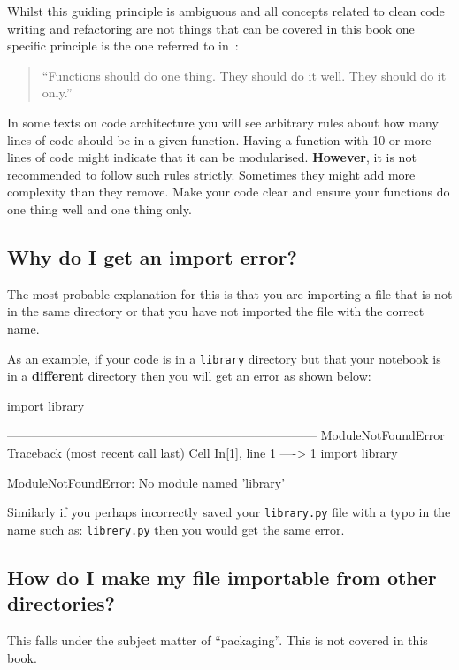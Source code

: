 Whilst this guiding principle is ambiguous and all concepts related to clean
code writing and refactoring are not things that can be covered in this book one
specific principle is the one referred to in~\cite{martin2009clean}:

\begin{quote}
``Functions should do one thing. They should do it well. They should do it
only.''
\end{quote}



In some texts on code architecture you will see arbitrary rules about how many
lines of code should be in a given function. Having a function with 10 or more
lines of code might indicate that it can be modularised. \textbf{However}, it is
not
recommended to follow such rules strictly. Sometimes they might add more complexity than
they remove. Make your code clear and
ensure your functions do one thing well and one thing only.


\subsection{Why do I get an import error?}
\label{\detokenize{building-tools/05-modularisation/why/main:why-do-i-get-an-import-error}}

The most probable explanation for this is that you are importing a file that is
not in the same directory or that you have not imported the file with the
correct name.


As an example, if your code is in a \texttt{library} directory but that your
notebook is in a \textbf{different} directory then you will get an error as shown
below:

\begin{pyin}
import library
\end{pyin}





\begin{raw}
---------------------------------------------------------------------------
ModuleNotFoundError                       Traceback (most recent call last)
Cell In[1], line 1
----> 1 import library

ModuleNotFoundError: No module named 'library'
\end{raw}






Similarly if you perhaps incorrectly saved your \texttt{library.py} file with a typo in
the name such as: \texttt{librery.py} then you would get the same error.


\subsection{How do I make my file importable from other directories?}
\label{\detokenize{building-tools/05-modularisation/why/main:how-do-i-make-my-file-importable-from-other-directories}}

This falls under the subject matter of ``packaging''. This is not covered in
this book.
